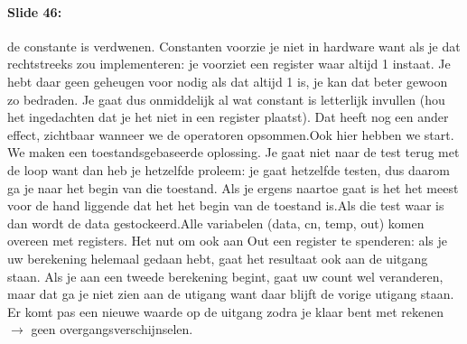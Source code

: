 \documentclass[10pt,a4paper]{book}
\begin{document}
\paragraph{Slide 46:} de constante is verdwenen. Constanten voorzie je niet in hardware want als je dat rechtstreeks zou implementeren: je voorziet een register waar altijd 1 instaat. Je hebt daar geen geheugen voor nodig als dat altijd 1 is, je kan dat beter gewoon zo bedraden. Je gaat dus onmiddelijk al wat constant is letterlijk invullen (hou het ingedachten dat je het niet in een register plaatst). Dat heeft nog een ander effect, zichtbaar wanneer we de operatoren opsommen.Ook hier hebben we start. We maken een toestandsgebaseerde oplossing. Je gaat niet naar de test terug met de loop want dan heb je hetzelfde proleem: je gaat hetzelfde testen, dus daarom ga je naar het begin van die toestand. Als je ergens naartoe gaat is het het meest voor de hand liggende dat het het begin van de toestand is.Als die test waar is dan wordt de data gestockeerd.Alle variabelen (data, cn, temp, out) komen overeen met registers. Het nut om ook aan Out een register te spenderen: als je uw berekening helemaal gedaan hebt, gaat het resultaat ook aan de uitgang staan. Als je aan een tweede berekening begint, gaat uw count wel veranderen, maar dat ga je niet zien aan de utigang want daar blijft de vorige utigang staan. Er komt pas een nieuwe waarde op de uitgang zodra je klaar bent met rekenen $\rightarrow$ geen overgangsverschijnselen.
\end{document}
